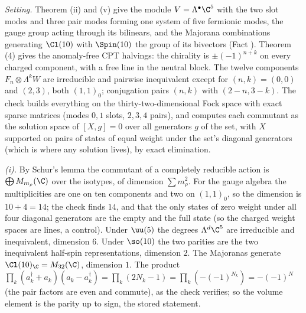 \emph{Setting.} Theorem (ii) and (v) give the module $V = \Lambda^{\bullet}\C^{5}$ with the two slot modes and three pair modes forming one system of five fermionic modes, the gauge group acting through its bilinears, and the Majorana combinations generating $\Cl(10)$ with $\Spin(10)$ the group of its bivectors (Fact ). Theorem (4) gives the anomaly-free CPT halvings: the chirality is $\pm(-1)^{n + k}$ on every charged component, with a free line in the neutral block. The twelve components $F_{n} \otimes \Lambda^{k}W$ are irreducible and pairwise inequivalent except for $(n, k) = (0, 0)$ and $(2, 3)$, both $(1,1)_{0}$; conjugation pairs $(n, k)$ with $(2 - n, 3 - k)$. The check builds everything on the thirty-two-dimensional Fock space with exact sparse matrices (modes $0, 1$ slots, $2, 3, 4$ pairs), and computes each commutant as the solution space of $[X, g] = 0$ over all generators $g$ of the set, with $X$ supported on pairs of states of equal weight under the set's diagonal generators (which is where any solution lives), by exact elimination.

\emph{(i).} By Schur's lemma the commutant of a completely reducible action is $\bigoplus M_{m_{\rho}}(\C)$ over the isotypes, of dimension $\sum m_{\rho}^{2}$. For the gauge algebra the multiplicities are one on ten components and two on $(1,1)_{0}$, so the dimension is $10 + 4 = 14$; the check finds $14$, and that the only states of zero weight under all four diagonal generators are the empty and the full state (so the charged weight spaces are lines, a control). Under $\uu(5)$ the degrees $\Lambda^{d}\C^{5}$ are irreducible and inequivalent, dimension $6$. Under $\so(10)$ the two parities are the two inequivalent half-spin representations, dimension $2$. The Majoranas generate $\Cl(10)_{\C} = M_{32}(\C)$, dimension $1$. The product $\prod_{k}(a^{\dagger}_{k} + a_{k})(a_{k} - a^{\dagger}_{k}) = \prod_{k}(2N_{k} - 1) = \prod_{k}(-(-1)^{N_{k}}) = -(-1)^{N}$ (the pair factors are even and commute), as the check verifies; so the volume element is the parity up to sign, the stored statement.

